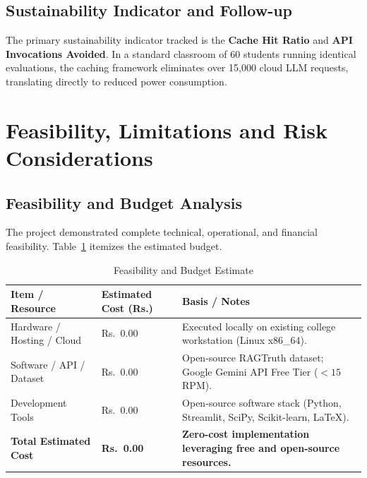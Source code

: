 \documentclass[11pt,a4paper]{article}
\renewcommand{\arraystretch}{1.2}
\begin{document}
\subsection{Sustainability Indicator and Follow-up}
The primary sustainability indicator tracked is the \textbf{Cache Hit Ratio} and \textbf{API Invocations Avoided}. In a standard classroom of 60 students running identical evaluations, the caching framework eliminates over 15,000 cloud LLM requests, translating directly to reduced power consumption.

\section{Feasibility, Limitations and Risk Considerations}

\subsection{Feasibility and Budget Analysis}
The project demonstrated complete technical, operational, and financial feasibility. Table~\ref{tab:budget} itemizes the estimated budget.

\begin{table}[htbp]
\centering
\caption{Feasibility and Budget Estimate}
\label{tab:budget}
\footnotesize
\renewcommand{\arraystretch}{1.25}
\begin{tabularx}{\linewidth}{|>{\RaggedRight}X|>{\centering\arraybackslash}p{3.0cm}|>{\RaggedRight}X|}
\hline
\rowcolor{tableheader}
Item / Resource & Estimated Cost (Rs.) & Basis / Notes \\
\hline
Hardware / Hosting / Cloud & Rs.~0.00 & Executed locally on existing college workstation (Linux x86\_64). \\
\hline
Software / API / Dataset & Rs.~0.00 & Open-source RAGTruth dataset; Google Gemini API Free Tier ($< 15$ RPM). \\
\hline
Development Tools & Rs.~0.00 & Open-source software stack (Python, Streamlit, SciPy, Scikit-learn, \LaTeX{}). \\
\hline
\rowcolor{vesitnavy!5}
\textbf{Total Estimated Cost} & \textbf{Rs.~0.00} & \textbf{Zero-cost implementation leveraging free and open-source resources.} \\
\hline
\end{tabularx}
\end{table}
\end{document}
